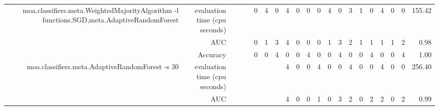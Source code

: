 \documentclass{article}
\providecommand{\tabularnewline}{\\}
\begin{document}
\begin{sidewaystable}
\begin{tabular}{|r|r|rrrrrr|r|r|r|r|r|r|r|r|r|r|r|r|r|}
 \cline{1-2} \cline{3-21}
\multirow{3}{*}{moa.classifiers.meta.WeightedMajorityAlgorithm -l functions.SGD,meta.AdaptiveRandomForest} & evaluation time (cpu seconds) & \multicolumn{1}{r}{} & \multicolumn{1}{r}{} & \multicolumn{1}{r|}{} & \multicolumn{1}{r|}{0} & \multicolumn{1}{r|}{4} & \multicolumn{1}{r|}{0} & \multicolumn{1}{r|}{4} & \multicolumn{1}{r|}{0} & \multicolumn{1}{r|}{0} & \multicolumn{1}{r|}{0} & \multicolumn{1}{r|}{4} & \multicolumn{1}{r|}{0} & \multicolumn{1}{r|}{3} & \multicolumn{1}{r|}{1} & \multicolumn{1}{r|}{0} & \multicolumn{1}{r|}{4} & \multicolumn{1}{r|}{0} & \multicolumn{1}{r|}{0} & 155.42\tabularnewline
 \cline{2-2} \cline{6-21}
 & AUC & \multicolumn{1}{r}{} & \multicolumn{1}{r}{} & \multicolumn{1}{r|}{} & \multicolumn{1}{r|}{0} & \multicolumn{1}{r|}{1} & \multicolumn{1}{r|}{3} & \multicolumn{1}{r|}{4} & \multicolumn{1}{r|}{0} & \multicolumn{1}{r|}{0} & \multicolumn{1}{r|}{0} & \multicolumn{1}{r|}{1} & \multicolumn{1}{r|}{3} & \multicolumn{1}{r|}{2} & \multicolumn{1}{r|}{1} & \multicolumn{1}{r|}{1} & \multicolumn{1}{r|}{1} & \multicolumn{1}{r|}{1} & \multicolumn{1}{r|}{2} & 0.98\tabularnewline
 \cline{2-2} \cline{6-21}
 & Accuracy & \multicolumn{1}{r}{} & \multicolumn{1}{r}{} & \multicolumn{1}{r|}{} & \multicolumn{1}{r|}{0} & \multicolumn{1}{r|}{0} & \multicolumn{1}{r|}{4} & \multicolumn{1}{r|}{0} & \multicolumn{1}{r|}{0} & \multicolumn{1}{r|}{4} & \multicolumn{1}{r|}{0} & \multicolumn{1}{r|}{0} & \multicolumn{1}{r|}{4} & \multicolumn{1}{r|}{0} & \multicolumn{1}{r|}{0} & \multicolumn{1}{r|}{4} & \multicolumn{1}{r|}{0} & \multicolumn{1}{r|}{0} & \multicolumn{1}{r|}{4} & 1.00\tabularnewline
 \cline{1-2} \cline{6-21}
\multirow{3}{*}{moa.classifiers.meta.AdaptiveRandomForest -s 30} & evaluation time (cpu seconds) & \multicolumn{1}{r}{} & \multicolumn{1}{r}{} & \multicolumn{1}{r}{} & \multicolumn{1}{r}{} & \multicolumn{1}{r}{} & \multicolumn{1}{r|}{} & \multicolumn{1}{r|}{4} & \multicolumn{1}{r|}{0} & \multicolumn{1}{r|}{0} & \multicolumn{1}{r|}{4} & \multicolumn{1}{r|}{0} & \multicolumn{1}{r|}{0} & \multicolumn{1}{r|}{4} & \multicolumn{1}{r|}{0} & \multicolumn{1}{r|}{0} & \multicolumn{1}{r|}{4} & \multicolumn{1}{r|}{0} & \multicolumn{1}{r|}{0} & 256.40\tabularnewline
 \cline{2-2} \cline{9-21}
 & AUC & \multicolumn{1}{r}{} & \multicolumn{1}{r}{} & \multicolumn{1}{r}{} & \multicolumn{1}{r}{} & \multicolumn{1}{r}{} & \multicolumn{1}{r|}{} & \multicolumn{1}{r|}{4} & \multicolumn{1}{r|}{0} & \multicolumn{1}{r|}{0} & \multicolumn{1}{r|}{1} & \multicolumn{1}{r|}{0} & \multicolumn{1}{r|}{3} & \multicolumn{1}{r|}{2} & \multicolumn{1}{r|}{0} & \multicolumn{1}{r|}{2} & \multicolumn{1}{r|}{2} & \multicolumn{1}{r|}{0} & \multicolumn{1}{r|}{2} & 0.99\tabularnewline

\end{tabular}
\end{sidewaystable}
\end{document}
